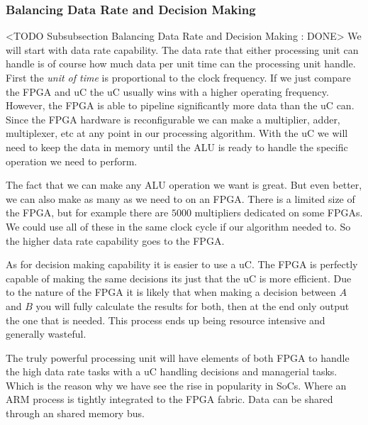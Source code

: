 \subsubsection{Balancing Data Rate and Decision Making}
	<TODO Subsubsection  Balancing Data Rate and Decision Making : DONE>
We will start with data rate capability. The data rate that either processing unit can handle is of course how much data per unit time can the processing unit handle. First the \emph{unit of time} is proportional to the clock frequency. If we just compare the \ac{FPGA} and \ac{uC} the \ac{uC} usually wins with a higher operating frequency. However, the \ac{FPGA} is able to pipeline significantly more data than the \ac{uC} can. Since the \ac{FPGA} hardware is reconfigurable we can make a multiplier, adder, multiplexer, etc at any point in our processing algorithm. With the \ac{uC} we will need to keep the data in memory until the \ac{ALU} is ready to handle the specific operation we need to perform.

The fact that we can make any \ac{ALU} operation we want is great. But even better, we can also make as many as we need to on an \ac{FPGA}. There is a limited size of the \ac{FPGA}, but for example there are $5000$ multipliers dedicated on some \ac{FPGA}s. We could use all of these in the same clock cycle if our algorithm needed to. So the higher data rate capability goes to the \ac{FPGA}.

As for decision making capability it is easier to use a \ac{uC}. The \ac{FPGA} is perfectly capable of making the same decisions its just that the \ac{uC} is more efficient. Due to the nature of the \ac{FPGA} it is likely that when making a decision between $A$ and $B$ you will fully calculate the results for both, then at the end only output the one that is needed. This process ends up being resource intensive and generally wasteful.

The truly powerful processing unit will have elements of both \ac{FPGA} to handle the high data rate tasks with a \ac{uC} handling decisions and managerial tasks. Which is the reason why we have see the rise in popularity in \ac{SoC}s. Where an \ac{ARM} process is tightly integrated to the \ac{FPGA} fabric. Data can be shared through an shared memory bus.

